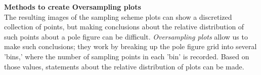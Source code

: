 \documentclass{article}
\begin{document}






\textbf{Methods to create Oversampling plots}\\
The resulting images of the sampling scheme plots can show a discretized collection of points, but making conclusions about the relative distribution of such points about a pole figure can be difficult. \textit{Oversampling plots} allow us to make such conclusions; they work by breaking up the pole figure grid into several 'bins,' where the number of sampling points in each 'bin' is recorded. Based on those values, statements about the relative distribution of plots can be made.
\end{document}
